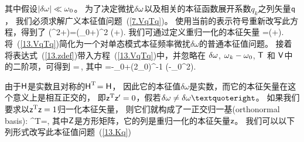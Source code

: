 {{%

其中假设$|\delta\mbox{$\omega$}|\ll\mbox{$\omega$}_0$。
为了决定微扰$\delta\mbox{$\omega$}$以及相关的本征函数展开系数$q_k$之列矢量$\mbox{${\sf q}$}$，
我们必须求解广义本征值问题~(\ref{7.VqTq})。
使用当前的表示符号重新改写此方程，得到了
\eq \label{13.VqTq}
(\ssOmega^2+\ssV)\ssq=(\om_0+\delta\om)^2
(\ssI+\ssT)\ssq.
\en
我们可通过定义重归一化的本征矢量
%
%
\eq \label{13.zdef}
\ssz=(\ssI+\half\ssT)\ssq.
\en
将~(\ref{13.VqTq})简化为一个对单态模式本征频率微扰$\delta\omega$的普通本征值问题。
接着将表达式~(\ref{13.zdef})带入方程~(\ref{13.VqTq})中，并忽略在
$\delta\mbox{$\omega$}$, $\mbox{$\omega$}_k-\mbox{$\omega$}_0$, $\mbox{${\sf T}$}$ 和 $\mbox{${\sf V}$}$中的二阶项，可得到
\eq \label{13.Kq}
\ssH\ssz=\delta\om\,\ssz,
\en
其中
\eq \label{13.Kdef}
\ssH=\ssOmega-\om_0\ssI+(2\om_0)^{-1}
(\ssV-\om_0^2\ssT).
\en

由于$\mbox{${\sf H}$}$是实数且对称的$\mbox{${\sf H}$}^{\rm T}\!=\mbox{${\sf H}$}$，
因此它的本征值$\delta\omega$是实数，而它的本征矢量在这个意义上是相互正交的，
即$\mbox{${\sf z}$}^{\rm T}\mbox{${\sf z}$}'=0$，假若$\delta\om\neq\delta\om’$。
如果我们要求以$\mbox{${\sf z}$}^{\rm T}\mbox{${\sf z}$}=1$归一化本征矢量，
则它们就构成了一正交归一基(orthonormal basis):
%
%
\eq \label{13.ZZeqI}
\ssZ^{\rm T}\ssZ=\ssI,
\en
其中$\mbox{${\sf Z}$}$是方形矩阵，它的列是重归一化的本征矢量$\mbox{${\sf z}$}$。
我们可以以下列形式改写此本征值问题~(\ref{13.Kq})
\eq \label{13.Kdiag}
}}
